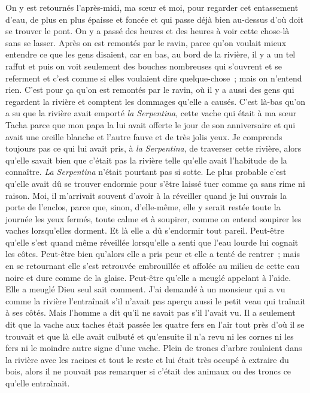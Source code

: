 \pend
%
\pstart
	On y est retournés l’après-midi, ma sœur et moi, pour regarder cet entassement d’eau, de plus en plus épaisse et foncée et qui passe déjà bien au-dessus d’où doit se trouver le pont. On y a passé des heures et des heures à voir cette chose-là sans se lasser. Après on est remontés par le ravin, parce qu’on voulait mieux entendre ce que les gens disaient, car en bas, au bord de la rivière, il y a un tel raffut et puis on voit seulement des bouches nombreuses qui s’ouvrent et se referment et c’est comme si elles voulaient dire quelque-chose ; mais on n’entend rien. C’est pour ça qu’on est remontés par le ravin, où il y a aussi des gens qui regardent la rivière et comptent les dommages qu’elle a causés. C’est là-bas qu’on a su que la rivière avait emporté \textit{la Serpentina}, cette vache qui était à ma sœur Tacha parce que mon papa la lui avait offerte le jour de son anniversaire et qui avait une oreille blanche et l’autre fauve et de très jolis yeux.
\pend
%
\pstart
	Je comprends toujours pas ce qui lui avait pris, à \textit{la Serpentina}, de traverser cette rivière, alors qu’elle savait bien que c’était pas la rivière telle qu’elle avait l’habitude de la connaître. \textit{La Serpentina} n’était pourtant pas si sotte. Le plus probable c’est qu’elle avait dû se trouver endormie pour s’être laissé tuer comme ça sans rime ni raison. Moi, il m’arrivait souvent d'avoir à la réveiller quand je lui ouvrais la porte de l’enclos, parce que, sinon, d’elle-même, elle y serait restée toute la journée les yeux fermés, toute calme et à soupirer, comme on entend soupirer les vaches lorsqu’elles dorment.
\pend
%
\pstart
	Et là elle a dû s'endormir tout pareil. Peut-être qu’elle s’est quand même réveillée lorsqu’elle a senti que l’eau lourde lui cognait les côtes. Peut-être bien qu’alors elle a pris peur et elle a tenté de rentrer ; mais en se retournant elle s’est retrouvée embrouillée et affolée au milieu de cette eau noire et dure comme de la glaise. Peut-être qu’elle a meuglé appelant à l’aide.
\pend
%
\pstart
	Elle a meuglé Dieu seul sait comment.
\pend
%
\pstart
	J’ai demandé à un monsieur qui a vu comme la rivière l’entraînait s’il n’avait pas aperçu aussi le petit veau qui traînait à ses côtés. Mais l’homme a dit qu’il ne savait pas s’il l’avait vu. Il a seulement dit que la vache aux taches était passée les quatre fers en l’air tout près d’où il se trouvait et que là elle avait culbuté et qu’ensuite il n’a revu ni les cornes ni les fers ni le moindre autre signe d’une vache. Plein de troncs d’arbre roulaient dans la rivière avec les racines et tout le reste et lui était très occupé à extraire du bois, alors il ne pouvait pas remarquer si c’était des animaux ou des troncs ce qu’elle entraînait.
